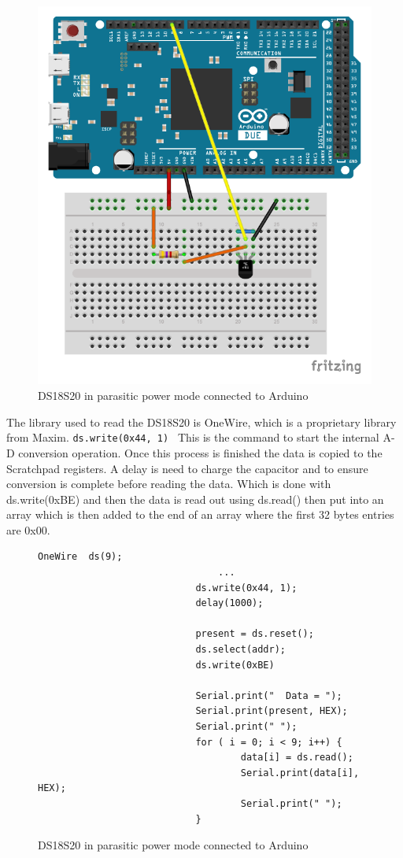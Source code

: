 \begin{figure}[h]
	\centering
	\includegraphics[width=.5\linewidth]{Figures/TempSensor_bb.pdf}
	\caption{DS18S20 in parasitic power mode connected to Arduino}
	\label{fig:tempcircuit}
\end{figure}


The library used to read the DS18S20 is OneWire, which is a proprietary library from Maxim. {\tt ds.write(0x44, 1) } This is the command to start the internal A-D conversion operation. Once this process is finished the data is copied to the Scratchpad registers. A delay is need to charge the capacitor and to ensure conversion is complete before reading the data. Which is done with ds.write(0xBE) and then the data is read out using ds.read() then put into an array which is then added to the end of an array where the first 32 bytes entries are 0x00.

\begin{figure}[H]
\begin{lstlisting}[style=Arduino]
  							OneWire  ds(9);
								...
  							ds.write(0x44, 1); 
  						 	delay(1000);

  							present = ds.reset();
  							ds.select(addr);    
 							ds.write(0xBE)

  							Serial.print("  Data = "); 
  							Serial.print(present, HEX);
 						 	Serial.print(" ");
  							for ( i = 0; i < 9; i++) {          
    								data[i] = ds.read();
    								Serial.print(data[i], HEX);
    								Serial.print(" ");
  							}

\end{lstlisting}
\caption{DS18S20 in parasitic power mode connected to Arduino}
\label{snip:tempcode}
\end{figure}


